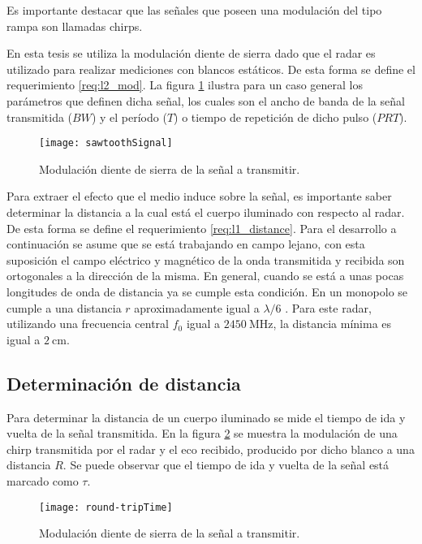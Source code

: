 \begin{description}
Es importante destacar que las señales que poseen una modulación del tipo rampa son llamadas chirps.

\end{description}

En esta tesis se utiliza la modulación diente de sierra dado que el radar es utilizado para realizar mediciones con blancos estáticos. De esta forma se define el requerimiento \ref{req:l2_mod}. La figura \ref{fig:sawtoothSignal} ilustra para un caso general los parámetros que definen dicha señal, los cuales son el ancho de banda de la señal transmitida ($BW$) y el período ($T$) o tiempo de repetición de dicho pulso ($PRT$).

\begin{figure}
 \centering
 \texttt{[image: sawtoothSignal]}
 \caption{Modulación diente de sierra de la señal a transmitir.}
 \label{fig:sawtoothSignal}
\end{figure}

Para extraer el efecto que el medio induce sobre la señal, es importante saber determinar la distancia a la cual está el cuerpo iluminado con respecto al radar. De esta forma se define el requerimiento \ref{req:l1_distance}. Para el desarrollo a continuación se asume que se está trabajando en campo lejano, con esta suposición el campo eléctrico y magnético de la onda transmitida y recibida son ortogonales a la dirección de la misma. En general, cuando se está a unas pocas longitudes de onda de distancia ya se cumple esta condición. En un monopolo se cumple a una distancia $r$ aproximadamente igual a $\lambda/ 6$ \cite{Richards2009}. Para este radar, utilizando una frecuencia central $f_0$ igual a $\SI{2450}{\MHz}$, la distancia mínima es igual a $\SI{2}{\centi\meter}$.


\subsection{Determinación de distancia}

Para determinar la distancia de un cuerpo iluminado se mide el tiempo de ida y vuelta de la señal transmitida. En la figura \ref{fig:roundTripTime} se muestra la modulación de una chirp transmitida por el radar y el eco recibido, producido por dicho blanco a una distancia $R$. Se puede observar que el tiempo de ida y vuelta de la señal está marcado como $\tau$.

\begin{figure}
 \centering
 \texttt{[image: round-tripTime]}
 \caption{Modulación diente de sierra de la señal a transmitir.}
 \label{fig:roundTripTime}
\end{figure}

